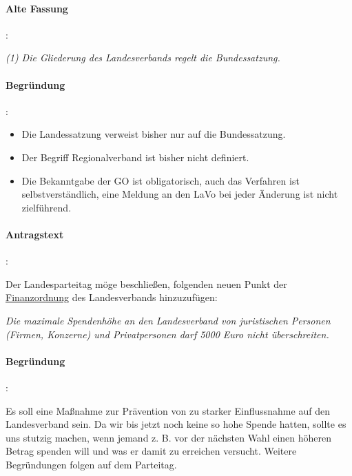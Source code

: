 \paragraph{Alte Fassung}:

\textit{(1) Die Gliederung des Landesverbands regelt die Bundessatzung.}

\paragraph{Begründung}:

\begin{itemize}
\item Die Landessatzung verweist bisher nur auf die Bundessatzung.
\item Der Begriff Regionalverband ist bisher nicht definiert.
\item Die Bekanntgabe der GO ist obligatorisch, auch das Verfahren ist selbstverständlich, eine Meldung an den LaVo bei jeder Änderung ist nicht zielführend.
\end{itemize}



\paragraph{Antragstext}:

Der Landesparteitag möge beschließen, folgenden neuen Punkt der \href{http://wiki.piratenpartei.de/LSA:Satzung#Abschnitt_B:_Finanzordnung}{Finanzordnung} des Landesverbands hinzuzufügen:

\textit{Die maximale Spendenhöhe an den Landesverband von juristischen Personen (Firmen, Konzerne) und Privatpersonen darf 5000 Euro nicht überschreiten.}

\paragraph{Begründung}:

Es soll eine Maßnahme zur Prävention von zu starker Einflussnahme auf den Landesverband sein. Da wir bis jetzt noch keine so hohe Spende hatten, sollte es uns stutzig machen, wenn jemand z. B. vor der nächsten Wahl einen höheren Betrag spenden will und was er damit zu erreichen versucht. Weitere Begründungen folgen auf dem Parteitag.
